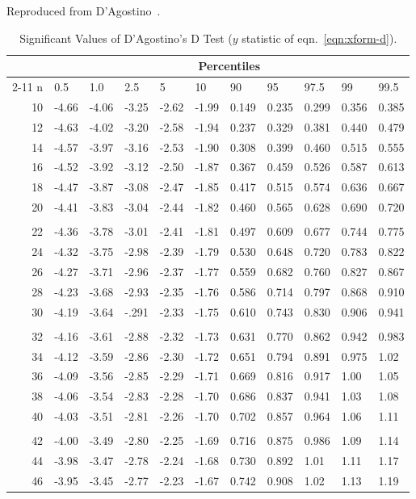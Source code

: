 \documentclass[draft]{article}
\begin{document}
\begin{table}
\caption{Significant Values of D'Agostino's D Test (\(y\) statistic
of eqn.~\protect\ref{eqn:xform-d}).}
\centerline{Reproduced from D'Agostino~\protect\cite{dagostino86}.}
\label{tbl:d-test}
\scriptsize
\begin{center}
\begin{tabular}{rllllllllll}\hline
& \multicolumn{10}{c}{Percentiles} \\ \cline{2-11}
n & 0.5 & 1.0 & 2.5 & 5 & 10 & 90 & 95 & 97.5 & 99 & 99.5 \\ \hline
10&-4.66&-4.06&-3.25&-2.62&-1.99&0.149&0.235&0.299&0.356&0.385\\
12&-4.63&-4.02&-3.20&-2.58&-1.94&0.237&0.329&0.381&0.440&0.479\\
14&-4.57&-3.97&-3.16&-2.53&-1.90&0.308&0.399&0.460&0.515&0.555\\
16&-4.52&-3.92&-3.12&-2.50&-1.87&0.367&0.459&0.526&0.587&0.613\\
18&-4.47&-3.87&-3.08&-2.47&-1.85&0.417&0.515&0.574&0.636&0.667\\
20&-4.41&-3.83&-3.04&-2.44&-1.82&0.460&0.565&0.628&0.690&0.720\\
\\
22&-4.36&-3.78&-3.01&-2.41&-1.81&0.497&0.609&0.677&0.744&0.775\\
24&-4.32&-3.75&-2.98&-2.39&-1.79&0.530&0.648&0.720&0.783&0.822\\
26&-4.27&-3.71&-2.96&-2.37&-1.77&0.559&0.682&0.760&0.827&0.867\\
28&-4.23&-3.68&-2.93&-2.35&-1.76&0.586&0.714&0.797&0.868&0.910\\
30&-4.19&-3.64&-.291&-2.33&-1.75&0.610&0.743&0.830&0.906&0.941\\
\\
32&-4.16&-3.61&-2.88&-2.32&-1.73&0.631&0.770&0.862&0.942&0.983\\
34&-4.12&-3.59&-2.86&-2.30&-1.72&0.651&0.794&0.891&0.975&1.02\\
36&-4.09&-3.56&-2.85&-2.29&-1.71&0.669&0.816&0.917&1.00&1.05\\
38&-4.06&-3.54&-2.83&-2.28&-1.70&0.686&0.837&0.941&1.03&1.08\\
40&-4.03&-3.51&-2.81&-2.26&-1.70&0.702&0.857&0.964&1.06&1.11\\
\\
42&-4.00&-3.49&-2.80&-2.25&-1.69&0.716&0.875&0.986&1.09&1.14\\
44&-3.98&-3.47&-2.78&-2.24&-1.68&0.730&0.892&1.01&1.11&1.17\\
46&-3.95&-3.45&-2.77&-2.23&-1.67&0.742&0.908&1.02&1.13&1.19\\

\end{tabular}
\end{center}
\end{table}
\end{document}
